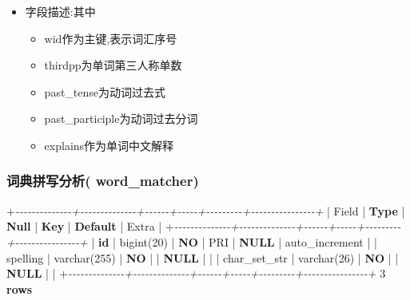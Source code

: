\documentclass[
]{article}
\newenvironment{Shaded}{}{}
\newcommand{\CommentTok}[1]{\textcolor[rgb]{0.38,0.63,0.69}{\textit{#1}}}
\newcommand{\DataTypeTok}[1]{\textcolor[rgb]{0.56,0.13,0.00}{#1}}
\newcommand{\DecValTok}[1]{\textcolor[rgb]{0.25,0.63,0.44}{#1}}
\newcommand{\KeywordTok}[1]{\textcolor[rgb]{0.00,0.44,0.13}{\textbf{#1}}}
\newcommand{\NormalTok}[1]{#1}
\newcommand{\OperatorTok}[1]{\textcolor[rgb]{0.40,0.40,0.40}{#1}}
\begin{document}
\begin{itemize}
\item
  字段描述:其中

  \begin{itemize}
  \item
    wid作为主键,表示词汇序号
  \item
    thirdpp为单词第三人称单数
  \item
    past\_tense为动词过去式
  \item
    past\_participle为动词过去分词
  \item
    explains作为单词中文解释
  \end{itemize}
\end{itemize}

\hypertarget{ux8bcdux5178ux62fcux5199ux5206ux6790-wordmatcher}{%
\subsubsection{词典拼写分析(
word\_matcher)}\label{ux8bcdux5178ux62fcux5199ux5206ux6790-wordmatcher}}

\begin{Shaded}
\begin{Highlighting}[]
\OperatorTok{+}\CommentTok{{-}{-}{-}{-}{-}{-}{-}{-}{-}{-}{-}{-}{-}{-}+{-}{-}{-}{-}{-}{-}{-}{-}{-}{-}{-}{-}{-}{-}+{-}{-}{-}{-}{-}{-}+{-}{-}{-}{-}{-}+{-}{-}{-}{-}{-}{-}{-}{-}{-}+{-}{-}{-}{-}{-}{-}{-}{-}{-}{-}{-}{-}{-}{-}{-}{-}+}
\NormalTok{| Field        | }\KeywordTok{Type}\NormalTok{         | }\KeywordTok{Null}\NormalTok{ | }\KeywordTok{Key}\NormalTok{ | }\KeywordTok{Default}\NormalTok{ | Extra          |}
\OperatorTok{+}\CommentTok{{-}{-}{-}{-}{-}{-}{-}{-}{-}{-}{-}{-}{-}{-}+{-}{-}{-}{-}{-}{-}{-}{-}{-}{-}{-}{-}{-}{-}+{-}{-}{-}{-}{-}{-}+{-}{-}{-}{-}{-}+{-}{-}{-}{-}{-}{-}{-}{-}{-}+{-}{-}{-}{-}{-}{-}{-}{-}{-}{-}{-}{-}{-}{-}{-}{-}+}
\NormalTok{| }\KeywordTok{id}\NormalTok{           | bigint(}\DecValTok{20}\NormalTok{)   | }\KeywordTok{NO}\NormalTok{   | PRI | }\KeywordTok{NULL}\NormalTok{    | auto\_increment |}
\NormalTok{| spelling     | }\DataTypeTok{varchar}\NormalTok{(}\DecValTok{255}\NormalTok{) | }\KeywordTok{NO}\NormalTok{   |     | }\KeywordTok{NULL}\NormalTok{    |                |}
\NormalTok{| char\_set\_str | }\DataTypeTok{varchar}\NormalTok{(}\DecValTok{26}\NormalTok{)  | }\KeywordTok{NO}\NormalTok{   |     | }\KeywordTok{NULL}\NormalTok{    |                |}
\OperatorTok{+}\CommentTok{{-}{-}{-}{-}{-}{-}{-}{-}{-}{-}{-}{-}{-}{-}+{-}{-}{-}{-}{-}{-}{-}{-}{-}{-}{-}{-}{-}{-}+{-}{-}{-}{-}{-}{-}+{-}{-}{-}{-}{-}+{-}{-}{-}{-}{-}{-}{-}{-}{-}+{-}{-}{-}{-}{-}{-}{-}{-}{-}{-}{-}{-}{-}{-}{-}{-}+}
\DecValTok{3} \KeywordTok{rows}
\end{Highlighting}
\end{Shaded}
\end{document}
